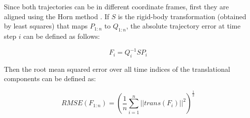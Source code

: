Since both trajectories can be in different coordinate frames, first they are aligned using the Horn method \cite{Horn}. If $S$ 
is the rigid-body transformation (obtained by least squares) that maps $P_{1:n}$ to $Q_{1:n}$, the absolute trajectory error
 at time step $i$ can be defined as follows:

\begin{equation}
F_i=Q_i^{-1}SP_i
\end{equation}

Then the root mean squared error over all time indices of the translational components can be defined as:

\begin{equation}
RMSE(F_{1:n}) = (\frac{1}{n} \sum_{i=1}^n ||trans(F_i)||^2 )^{\frac{1}{2}}
\end{equation}





